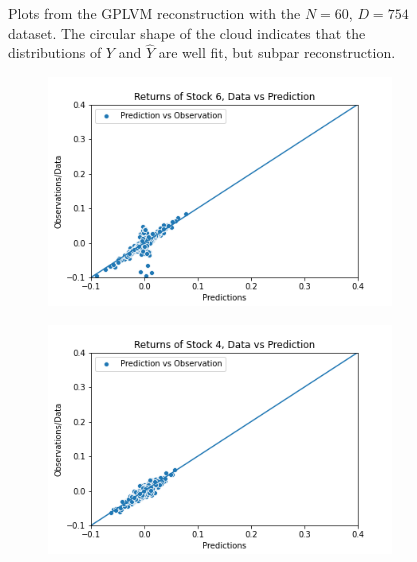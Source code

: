 \begin{figure}
\begin{subfigure}[r]{0.3\textwidth}
	\end{subfigure}
	\caption[Y-$\hat{Y}$ pair plots for N=100 with the GPLVM model]{Plots from the GPLVM reconstruction with the $N=60$, $D=754$ dataset. The circular shape of the cloud indicates that the distributions of $Y$ and $\hat{Y}$ are well fit, but subpar reconstruction.}
	\label{fig:gplvm_N100_pairs}
\end{figure}
\begin{figure}%
	\centering
	\begin{subfigure}[l]{0.3\textwidth}
		\includegraphics[width=\textwidth]{img/07_0/N120/Q1_kernel3_stock6_scatter.png}
	\end{subfigure}
	\begin{subfigure}[c]{0.3\textwidth}
		\includegraphics[width=\textwidth]{img/07_0/N120/Q6_kernel1_stock4_scatter.png}
	\end{subfigure}
	\begin{subfigure}[r]{0.3\textwidth}

\end{subfigure}
\end{figure}
